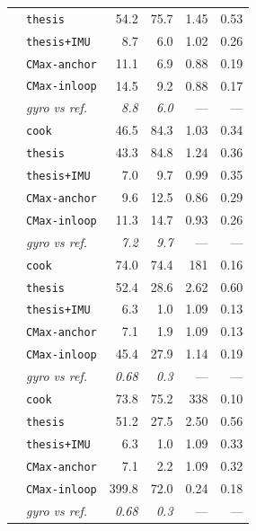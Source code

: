 \documentclass[journal]{IEEEtran}
\begin{document}
\begin{table}[!t]
\begin{tabular}{@{}llrrrr@{}}
 & \texttt{thesis}       & 54.2 & 75.7 & 1.45 & 0.53 \\
 & \texttt{thesis+IMU}   & 8.7 & 6.0 & 1.02 & 0.26 \\
 & \texttt{CMax-anchor}  & 11.1 & 6.9 & 0.88 & 0.19 \\
 & \texttt{CMax-inloop}  & 14.5 & 9.2 & 0.88 & 0.17 \\
 & \emph{gyro vs ref.}   & \emph{8.8} & \emph{6.0} & --- & --- \\
\midrule
{}
 & \texttt{cook}         & 46.5 & 84.3 & 1.03 & 0.34 \\
 & \texttt{thesis}       & 43.3 & 84.8 & 1.24 & 0.36 \\
 & \texttt{thesis+IMU}   & 7.0 & 9.7 & 0.99 & 0.35 \\
 & \texttt{CMax-anchor}  & 9.6 & 12.5 & 0.86 & 0.29 \\
 & \texttt{CMax-inloop}  & 11.3 & 14.7 & 0.93 & 0.26 \\
 & \emph{gyro vs ref.}   & \emph{7.2} & \emph{9.7} & --- & --- \\
\midrule
{}
 & \texttt{cook}         & 74.0 & 74.4 & 181 & 0.16 \\
 & \texttt{thesis}       & 52.4 & 28.6 & 2.62 & 0.60 \\
 & \texttt{thesis+IMU}   & 6.3 & 1.0 & 1.09 & 0.13 \\
 & \texttt{CMax-anchor}  & 7.1 & 1.9 & 1.09 & 0.13 \\
 & \texttt{CMax-inloop}  & 45.4 & 27.9 & 1.14 & 0.19 \\
 & \emph{gyro vs ref.}   & \emph{0.68} & \emph{0.3} & --- & --- \\
\midrule
{}
 & \texttt{cook}         & 73.8 & 75.2 & 338 & 0.10 \\
 & \texttt{thesis}       & 51.2 & 27.5 & 2.50 & 0.56 \\
 & \texttt{thesis+IMU}   & 6.3 & 1.0 & 1.09 & 0.33 \\
 & \texttt{CMax-anchor}  & 7.1 & 2.2 & 1.09 & 0.32 \\
 & \texttt{CMax-inloop}  & 399.8 & 72.0 & 0.24 & 0.18 \\
 & \emph{gyro vs ref.}   & \emph{0.68} & \emph{0.3} & --- & --- \\
\bottomrule
\end{tabular}
\end{table}
\end{document}
